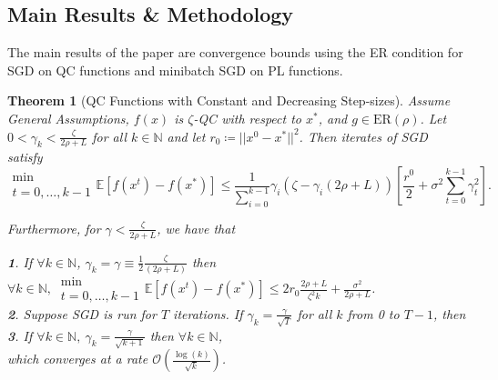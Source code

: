 \documentclass{article}
\newtheorem{theorem}{Theorem}[section]
\begin{document}
\subsection{Main Results \& Methodology}
The main results of the paper are convergence bounds using the ER condition for SGD on QC functions and minibatch SGD on PL functions.
\begin{theorem}[QC Functions with Constant and Decreasing Step-sizes]
	\label{them31}
	Assume \textit{General Assumptions}, $f(x)$ is $\zeta$-QC with respect to $x^*$, and $g\in\text{ER}(\rho)$. Let $0 < \gamma_k < \frac{\zeta}{2\rho + L}$ for all $k\in\mathbb{N}$ and let $r_0\coloneqq ||x^0 - x^*||^2$.
	Then iterates of SGD satisfy
	\[
		\substack{\min \\ t=0,\dots, k-1}\mathbb{E}\left[f(x^t) - f(x^*)\right] \leq \frac{1}{\sum_{i=0}^{k-1}}\gamma_i (\zeta - \gamma_i (2\rho + L)) \left[\frac{r^0}{2} + \sigma^2 \sum^{k-1}_{t=0}\gamma_t^2\right].
	\]

	Furthermore, for $\gamma < \frac{\zeta}{2\rho + L}$, we have that

	\textbf{1}. If $\forall k\in\mathbb{N}$, $\gamma_k = \gamma \equiv \frac{1}{2}\frac{\zeta}{(2\rho + L)}$ then $\forall k\in\mathbb{N},\ \substack{\min \\ t=0,\dots, k-1}\mathbb{E}[f(x^t) - f(x^*)]\leq 2r_0 \frac{2\rho + L}{\zeta^2 k} + \frac{\sigma^2}{2\rho + L}$. \\
	\textbf{2}. Suppose SGD is run for $T$ iterations. If $\gamma_k = \frac{\gamma}{\sqrt{T}}$ for all $k$ from 0 to $T-1$, then\\
	\textbf{3}. If $\forall k\in\mathbb{N},\ \gamma_k = \frac{\gamma}{\sqrt{k+1}}$ then $\forall k \in\mathbb{N}$, \\
	which converges at a rate $\mathcal{O}\left(\frac{\log(k)}{\sqrt{k}}\right)$.
\end{theorem}
\end{document}
